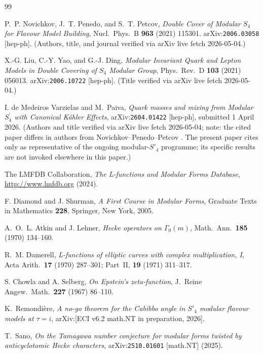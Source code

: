 \documentclass[12pt]{amsart}
\theoremstyle{definition}
\begin{document}
\begin{thebibliography}{99}

P.~P. Novichkov, J.~T. Penedo, and S.~T. Petcov,
\emph{Double Cover of Modular $S_4$ for Flavour Model Building},
Nucl.\ Phys.\ B \textbf{963} (2021) 115301.
arXiv:\texttt{2006.03058} [hep-ph].
\textup{(Authors, title, and journal verified via arXiv live fetch 2026-05-04.)}

X.-G. Liu, C.-Y. Yao, and G.-J. Ding,
\emph{Modular Invariant Quark and Lepton Models in Double Covering of
$S_4$ Modular Group},
Phys.\ Rev.\ D \textbf{103} (2021) 056013.
arXiv:\texttt{2006.10722} [hep-ph].
\textup{(Title verified via arXiv live fetch 2026-05-04.)}

I. de Medeiros Varzielas and M.~Paiva,
\emph{Quark masses and mixing from Modular $S_4^{\prime}$ with Canonical
K\"ahler Effects},
arXiv:\texttt{2604.01422} [hep-ph], submitted 1 April 2026.
\textup{(Authors and title verified via arXiv live fetch 2026-05-04;
note: the cited paper \cite{dMVP26} differs in authors from Novichkov--Penedo--Petcov
\cite{NPP20}.  The present paper cites \cite{dMVP26} only as representative
of the ongoing modular-$S'_4$ programme; its specific results are not
invoked elsewhere in this paper.)}

The LMFDB Collaboration,
\emph{The L-functions and Modular Forms Database},
\url{http://www.lmfdb.org} (2024).

F. Diamond and J. Shurman,
\emph{A First Course in Modular Forms},
Graduate Texts in Mathematics \textbf{228},
Springer, New York, 2005.

A.~O.~L. Atkin and J. Lehner,
\emph{Hecke operators on $\Gamma_0(m)$},
Math.\ Ann.\ \textbf{185} (1970) 134--160.

R.~M. Damerell,
\emph{L-functions of elliptic curves with complex multiplication, I},
Acta Arith.\ \textbf{17} (1970) 287--301;
Part~II, \textbf{19} (1971) 311--317.

S. Chowla and A. Selberg,
\emph{On Epstein's zeta-function},
J.~Reine Angew.\ Math.\ \textbf{227} (1967) 86--110.

K.~Remondi\`{e}re,
\emph{A no-go theorem for the Cabibbo angle in $S'_4$ modular flavour models
at $\tau=i$},
arXiv:[ECI v6.2 math.NT in preparation, 2026].

T.~Sano,
\emph{On the Tamagawa number conjecture for modular forms twisted by
  anticyclotomic Hecke characters},
arXiv:\texttt{2510.01601} [math.NT] (2025).


\end{thebibliography}
\end{document}
